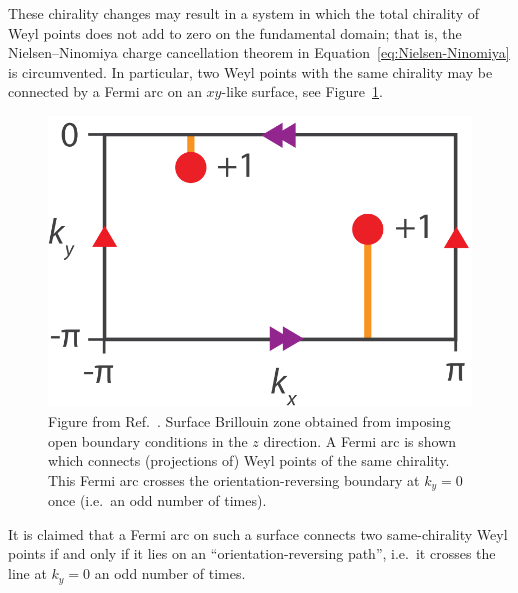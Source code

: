 These chirality changes may result in a system in which the total chirality of Weyl points does not add to zero on the fundamental domain; that is, the Nielsen--Ninomiya charge cancellation theorem in Equation~\eqref{eq:Nielsen-Ninomiya} is circumvented. In particular, two Weyl points with the same chirality may be connected by a Fermi arc on an $xy$-like surface, see Figure~\ref{fig:same-chirality}.
\begin{figure}[htb!]
	\centering
	\includegraphics[width=.5\linewidth]{Images/same-chirality}
	\caption{Figure from Ref.~\cite{Fonseca-Vaidya_nonorientable}. Surface Brillouin zone obtained from imposing open boundary conditions in the $z$ direction. A Fermi arc is shown which connects (projections of) Weyl points of the same chirality. This Fermi arc crosses the orientation-reversing boundary at $k_y=0$ once (i.e.\ an odd number of times).}
	\label{fig:same-chirality}
\end{figure}
It is claimed that a Fermi arc on such a surface connects two same-chirality Weyl points if and only if it lies on an ``orientation-reversing path'', i.e.\ it crosses the line at $k_y=0$ an odd number of times.

